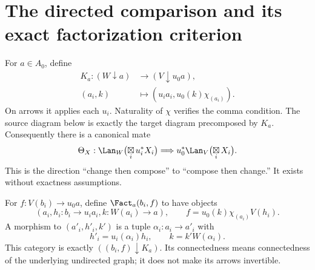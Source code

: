 \section{The directed comparison and its exact factorization criterion}
For $a\in A_0$, define
\begin{align*}
 K_a:(W\downarrow a)&\longrightarrow(V\downarrow u_0a),\\
 (a_i,k)&\longmapsto
       (u_i a_i,u_0(k)\chi_{(a_i)}).
\end{align*}
On arrows it applies each $u_i$. Naturality of $\chi$ verifies the comma
condition. The source diagram below is exactly the target diagram
precomposed by $K_a$. Consequently there is a canonical mate
\begin{equation}\label{eq:mate}
 \Theta_X:\Lan_W\bigl(\mathop{\boxtimes}_i u_i^*X_i\bigr)
       \Longrightarrow u_0^*\Lan_V\bigl(\mathop{\boxtimes}_i X_i\bigr).
\end{equation}
This is the direction ``change then compose'' to ``compose then change.''
It exists without exactness assumptions.

For $f:V(b_i)\to u_0a$, define $\Fact_a(b_i,f)$ to have objects
\[
 (a_i,h_i:b_i\to u_i a_i,k:W(a_i)\to a),
 \qquad f=u_0(k)\chi_{(a_i)}V(h_i).
\]
A morphism to $(a'_i,h'_i,k')$ is a tuple $\alpha_i:a_i\to a'_i$ with
\[
 h'_i=u_i(\alpha_i)h_i,\qquad k=k'W(\alpha_i).
\]
This category is exactly $((b_i,f)\downarrow K_a)$. Its connectedness
means connectedness of the underlying undirected graph; it does not make
its arrows invertible.


